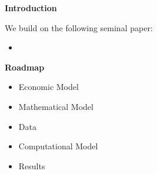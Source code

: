 \begin{frame}\begin{center}
	\LARGE\textbf{Introduction}
\end{center}\end{frame}
\begin{frame}

We build on the following seminal paper:
\begin{itemize}
\item {}
\end{itemize}
\end{frame}
\begin{frame}\textbf{Roadmap}\vspace{0.5cm}

\begin{itemize}\setlength\itemsep{1em}
\item Economic Model
\item Mathematical Model
\item Data
\item Computational Model
\item Results
\end{itemize}

\end{frame}
